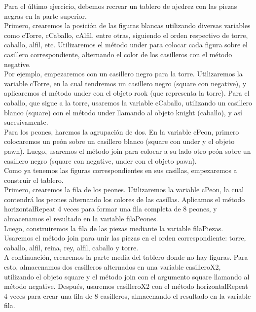 \documentclass[10pt, a4paper]{article}
\begin{document}
		\begin{flushleft}
			Para el último ejercicio, debemos recrear un tablero de ajedrez con las piezas negras en la parte superior.\\	
			Primero, crearemos la posición de las figuras blancas utilizando diversas variables como cTorre, cCaballo, cAlfil, entre otras, siguiendo el orden respectivo de torre, caballo, alfil, etc. Utilizaremos el método under para colocar cada figura sobre el casillero correspondiente, alternando el color de los casilleros con el método negative.	\\		
			Por ejemplo, empezaremos con un casillero negro para la torre. Utilizaremos la variable cTorre, en la cual tendremos un casillero negro (square con negative), y aplicaremos el método under con el objeto rook (que representa la torre). Para el caballo, que sigue a la torre, usaremos la variable cCaballo, utilizando un casillero blanco (square) con el método under llamando al objeto knight (caballo), y así sucesivamente. \\			
			Para los peones, haremos la agrupación de dos. En la variable cPeon, primero colocaremos un peón sobre un casillero blanco (square con under y el objeto pawn). Luego, usaremos el método join para colocar a su lado otro peón sobre un casillero negro (square con negative, under con el objeto pawn).\\
			Como ya tenemos las figuras correspondientes en sus casillas, empezaremos a construir el tablero.\\	
			Primero, crearemos la fila de los peones. Utilizaremos la variable cPeon, la cual contendrá los peones alternando los colores de las casillas. Aplicamos el método horizontalRepeat 4 veces para formar una fila completa de 8 peones, y almacenamos el resultado en la variable filaPeones.	\\		
			Luego, construiremos la fila de las piezas mediante la variable filaPiezas. Usaremos el método join para unir las piezas en el orden correspondiente: torre, caballo, alfil, reina, rey, alfil, caballo y torre.	\\		
			A continuación, crearemos la parte media del tablero donde no hay figuras. Para esto, almacenamos dos casilleros alternados en una variable casilleroX2, utilizando el objeto square y el método join con el argumento square llamando al método negative. Después, usaremos casilleroX2 con el método horizontalRepeat 4 veces para crear una fila de 8 casilleros, almacenando el resultado en la variable fila.	\\		

\end{flushleft}
\end{document}
